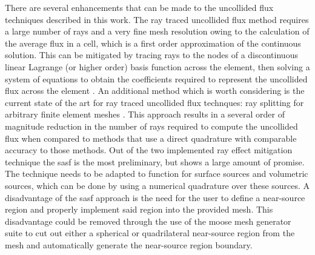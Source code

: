 There are several enhancements that can be made to the uncollided flux techniques described in this work. The ray traced uncollided flux method requires a large number of rays and a very fine mesh resolution owing to the calculation of the average flux in a cell, which is a first order approximation of the continuous solution. This can be mitigated by tracing rays to the nodes of a discontinuous linear Lagrange (or higher order) basis function across the element, then solving a system of equations to obtain the coefficients required to represent the uncollided flux across the element \cite{harbour_uncollided}. An additional method which is worth considering is the current state of the art for ray traced uncollided flux technques: ray splitting for arbitrary finite element meshes \cite{fem_arbitrary_uncollided}. This approach results in a several order of magnitude reduction in the number of rays required to compute the uncollided flux when compared to methods that use a direct quadrature with comparable accuracy to those methods. Out of the two implemented ray effect mitigation technique the \acrshort{sasf} is the most preliminary, but shows a large amount of promise. The technique needs to be adapted to function for surface sources and volumetric sources, which can be done by using a numerical quadrature over these sources. A disadvantage of the \acrshort{sasf} approach is the need for the user to define a near-source region and properly implement said region into the provided mesh. This disadvantage could be removed through the use of the \acrshort{moose} mesh generator suite to cut out either a spherical or quadrilateral near-source region from the mesh and automatically generate the near-source region boundary. 

